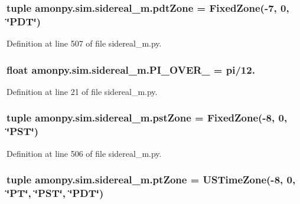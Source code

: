 \hypertarget{namespaceamonpy_1_1sim_1_1sidereal__m_a91dab6aa12f619a32e01ee9f4e8cec4b}{
\subsubsection[{pdt\-Zone}]{\setlength{\rightskip}{0pt plus 5cm}tuple amonpy.\-sim.\-sidereal\-\_\-m.\-pdt\-Zone = {\bf Fixed\-Zone}(-\/7, 0, \char`\"{}P\-D\-T\char`\"{})}}\label{namespaceamonpy_1_1sim_1_1sidereal__m_a91dab6aa12f619a32e01ee9f4e8cec4b}


Definition at line 507 of file sidereal\-\_\-m.\-py.

\hypertarget{namespaceamonpy_1_1sim_1_1sidereal__m_ac765e90836e95c8b75181438ab72671a}{
\subsubsection[{P\-I\-\_\-\-O\-V\-E\-R\-\_\-12}]{\setlength{\rightskip}{0pt plus 5cm}float amonpy.\-sim.\-sidereal\-\_\-m.\-P\-I\-\_\-\-O\-V\-E\-R\-\_ = pi/12.}}\label{namespaceamonpy_1_1sim_1_1sidereal__m_ac765e90836e95c8b75181438ab72671a}


Definition at line 21 of file sidereal\-\_\-m.\-py.

\hypertarget{namespaceamonpy_1_1sim_1_1sidereal__m_aaa8d0a3e675960c403a39cfae69909a9}{
\subsubsection[{pst\-Zone}]{\setlength{\rightskip}{0pt plus 5cm}tuple amonpy.\-sim.\-sidereal\-\_\-m.\-pst\-Zone = {\bf Fixed\-Zone}(-\/8, 0, \char`\"{}P\-S\-T\char`\"{})}}\label{namespaceamonpy_1_1sim_1_1sidereal__m_aaa8d0a3e675960c403a39cfae69909a9}


Definition at line 506 of file sidereal\-\_\-m.\-py.

\hypertarget{namespaceamonpy_1_1sim_1_1sidereal__m_a72b55d3f3fb71e3e634d985a9034d1a2}{
\subsubsection[{pt\-Zone}]{\setlength{\rightskip}{0pt plus 5cm}tuple amonpy.\-sim.\-sidereal\-\_\-m.\-pt\-Zone = {\bf U\-S\-Time\-Zone}(-\/8, 0, \char`\"{}P\-T\char`\"{}, \char`\"{}P\-S\-T\char`\"{}, \char`\"{}P\-D\-T\char`\"{})}}\label{namespaceamonpy_1_1sim_1_1sidereal__m_a72b55d3f3fb71e3e634d985a9034d1a2}


